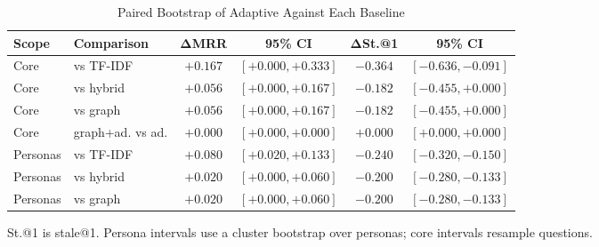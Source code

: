 \begin{table}[t]
\caption{Paired Bootstrap of Adaptive Against Each Baseline}
\label{tab:bootstrap}
\centering
\scriptsize
\setlength{\tabcolsep}{2pt}
\begin{tabular}{@{}llcccc@{}}
\toprule
\textbf{Scope} & \textbf{Comparison} & $\boldsymbol{\Delta}$\textbf{MRR} & \textbf{95\% CI} & $\boldsymbol{\Delta}$\textbf{St.@1} & \textbf{95\% CI} \\
\midrule
Core & vs TF-IDF & $+0.167$ & $[+0.000, +0.333]$ & $-0.364$ & $[-0.636, -0.091]$ \\
Core & vs hybrid & $+0.056$ & $[+0.000, +0.167]$ & $-0.182$ & $[-0.455, +0.000]$ \\
Core & vs graph & $+0.056$ & $[+0.000, +0.167]$ & $-0.182$ & $[-0.455, +0.000]$ \\
Core & graph+ad. vs ad. & $+0.000$ & $[+0.000, +0.000]$ & $+0.000$ & $[+0.000, +0.000]$ \\
\midrule
Personas & vs TF-IDF & $+0.080$ & $[+0.020, +0.133]$ & $-0.240$ & $[-0.320, -0.150]$ \\
Personas & vs hybrid & $+0.020$ & $[+0.000, +0.060]$ & $-0.200$ & $[-0.280, -0.133]$ \\
Personas & vs graph & $+0.020$ & $[+0.000, +0.060]$ & $-0.200$ & $[-0.280, -0.133]$ \\
\bottomrule
\end{tabular}
\par\vspace{2pt}
\raggedright\scriptsize St.@1 is stale@1. Persona intervals use a cluster bootstrap over personas; core intervals resample questions.
\end{table}
